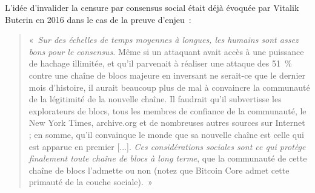 L'idée d'invalider la censure par consensus social était déjà évoquée par Vitalik Buterin en 2016 dans le cas de la preuve d'enjeu~:

\begin{quote}
«~\emph{Sur des échelles de temps moyennes à longues, les humains sont assez bons pour le consensus.} Même si un attaquant avait accès à une puissance de hachage illimitée, et qu'il parvenait à réaliser une attaque des 51~\% contre une chaîne de blocs majeure en inversant ne serait-ce que le dernier mois d'histoire, il aurait beaucoup plus de mal à convaincre la communauté de la légitimité de la nouvelle chaîne. Il faudrait qu'il subvertisse les explorateurs de blocs, tous les membres de confiance de la communauté, le New York Times, archive.org et de nombreuses autres sources sur Internet ; en somme, qu'il convainque le monde que sa nouvelle chaîne est celle qui est apparue en premier [...]. \emph{Ces considérations sociales sont ce qui protège finalement toute chaîne de blocs à long terme}, que la communauté de cette chaîne de blocs l'admette ou non (notez que Bitcoin Core admet cette primauté de la couche sociale).~»
\end{quote}

%

